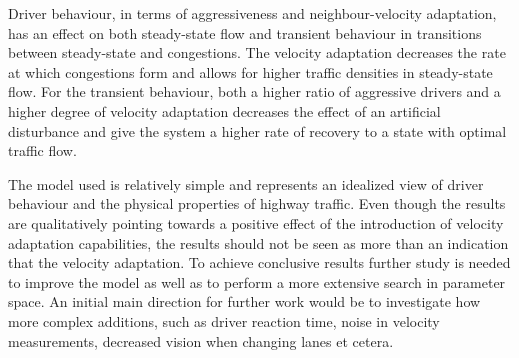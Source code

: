 \documentclass[11pt,a4paper,twocolumn]{article}
\begin{document}
Driver behaviour, in terms of aggressiveness and neighbour-velocity adaptation, has an effect on both steady-state flow and transient behaviour in transitions between steady-state and congestions. The velocity adaptation decreases the rate at which congestions form and allows for higher traffic densities in steady-state flow. For the transient behaviour, both a higher ratio of aggressive drivers and a higher degree of velocity adaptation decreases the effect of an artificial disturbance and give the system a higher rate of recovery to a state with optimal traffic flow.

The model used is relatively simple and represents an idealized view of driver behaviour and the physical properties of highway traffic. Even though the results are qualitatively pointing towards a positive effect of the introduction of velocity adaptation capabilities, the results should not be seen as more than an indication that the velocity adaptation. To achieve conclusive results further study is needed to improve the model as well as to perform a more extensive search in parameter space. An initial main direction for further work would be to investigate how more complex additions, such as driver reaction time, noise in velocity measurements, decreased vision when changing lanes et cetera.





\end{document}
